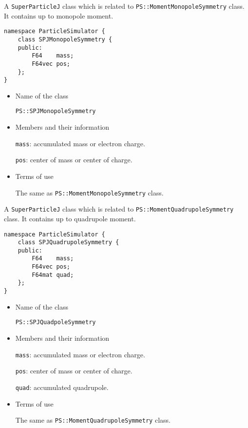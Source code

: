 \label{sec:SPJMonopoleSymmetry}

A \texttt{SuperParticleJ} class which is related to \texttt{PS::MomentMonopoleSymmetry} class. It contains up to monopole moment.

\begin{screen}
\begin{verbatim}
namespace ParticleSimulator {
    class SPJMonopoleSymmetry {
    public:
        F64    mass;
        F64vec pos;
    };
}
\end{verbatim}
\end{screen}

\begin{itemize}
  
\item Name of the class

  \texttt{PS::SPJMonopoleSymmetry}

\item Members and their information

  \texttt{mass}: accumulated mass or electron charge.

  \texttt{pos}: center of mass or center of charge.


\item Terms of use

  The same as \texttt{PS::MomentMonopoleSymmetry} class.

\end{itemize}  

\label{sec:SPJQuadrupoleSymmetry}

A \texttt{SuperParticleJ} class which is related to \texttt{PS::MomentQuadrupoleSymmetry} class. It contains up to quadrupole moment.

\begin{screen}
\begin{verbatim}
namespace ParticleSimulator {
    class SPJQuadrupoleSymmetry {
    public:
        F64    mass;
        F64vec pos;
        F64mat quad;
    };
}
\end{verbatim}
\end{screen}

\begin{itemize}
  
\item Name of the class

  \texttt{PS::SPJQuadpoleSymmetry}

\item Members and their information

  \texttt{mass}: accumulated mass or electron charge.

  \texttt{pos}: center of mass or center of charge.

  \texttt{quad}: accumulated quadrupole.

\item Terms of use

  The same as \texttt{PS::MomentQuadrupoleSymmetry} class.

\end{itemize}  

